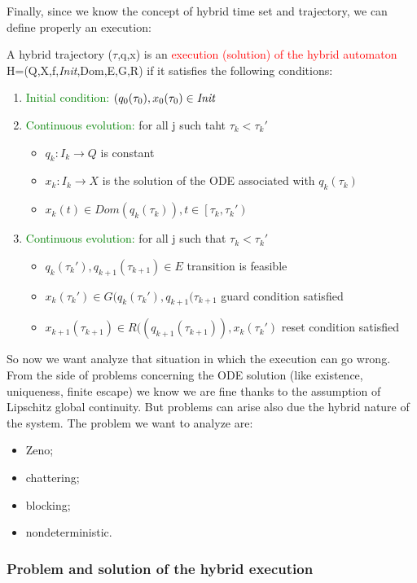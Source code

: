 Finally, since we know the concept of hybrid time set and trajectory,  we can define properly an execution:
\begin{defn} 
	A hybrid trajectory ($\tau$,q,x) is an \textcolor{red}{execution (solution) of the hybrid automaton} H=(Q,X,f,\textit{Init},Dom,E,G,R) if it satisfies the following conditions:
	\begin{enumerate}
		\item \textcolor{green}{Initial condition:} $(q_0(\tau_0),x_0(\tau_0)\in \emph{Init}$
		\item \textcolor{green}{Continuous evolution:} for all j such taht $\tau_k < \tau_k'$ 
		\begin{itemize}
			\item $q_k\colon I_k\to Q$ is constant
			\item $x_k\colon I_k \to X$ is the solution of the ODE associated with $q_k(\tau_k)$
			\item $x_k(t)\in Dom(q_k(\tau_k)),t\in \left[\tau_k,\tau_k'\right)$
		\end{itemize}
		\item \textcolor{green}{Continuous evolution:} for all j such that $\tau_k < \tau_k'$ 
		\begin{itemize}
			\item $q_k(\tau_k'),q_{k+1}(\tau_{k+1})\in E$ transition is feasible
			\item $x_k(\tau_k')\in G(q_k(\tau_k'),q_{k+1}(\tau_{k+1}$ guard condition satisfied
			\item $x_{k+1}(\tau_{k+1})\in R((q_{k+1}(\tau_{k+1})),x_k(\tau_k')$ reset condition satisfied
		\end{itemize}
	\end{enumerate}
\end{defn}
So now we want analyze that situation in which the execution can go wrong. From the side of problems concerning the ODE solution (like existence, uniqueness, finite escape) we know we are fine thanks to the assumption of Lipschitz global continuity. But problems can arise also due the hybrid nature of the system. The problem we want to analyze are:
\begin{itemize}
	\item Zeno;
	\item chattering;
	\item blocking;
	\item nondeterministic.
\end{itemize}

\subsubsection{Problem and solution of the hybrid execution }
